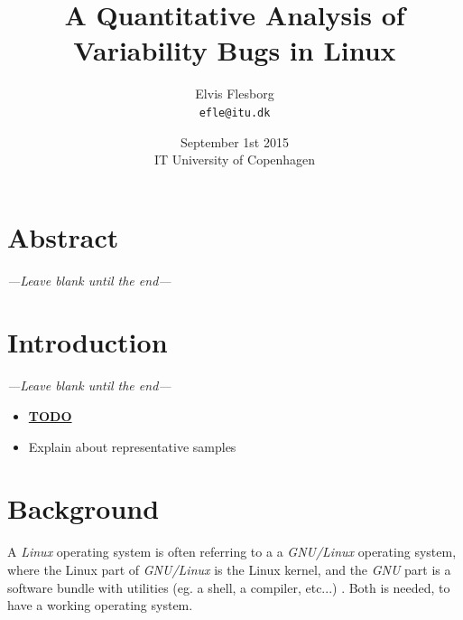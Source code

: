 \documentclass[a4paper,11pt]{report}
\begin{document}
\setlength{\parindent}{0cm}
\setlength{\unitlength}{1mm}

\date{September 1st 2015\\ IT University of Copenhagen}
\title{A Quantitative Analysis of Variability Bugs in Linux}
\author{Elvis Flesborg\\
\texttt{efle@itu.dk}}
\clearpage\maketitle
\thispagestyle{empty}
\newpage

\tableofcontents
\thispagestyle{empty}



\newpage

\setcounter{page}{1}

\chapter{Abstract}
\emph{---Leave blank until the end---}

\chapter{Introduction}
\emph{---Leave blank until the end---}


\begin{itemize}
    \item \underline{\textbf{TODO}}
        \item Explain about representative samples
\end{itemize}


\newpage
        \chapter{Background}

A \emph{Linux} operating system is often referring to a a \emph{GNU/Linux} 
operating system, where the Linux part of \emph{GNU/Linux} is the Linux kernel, 
and the \emph{GNU} part is a software bundle with utilities (eg. a shell, a 
compiler, etc...) \cite{gnu_pack}. Both is 
needed, to have a working operating system. 
\\
\end{document}
